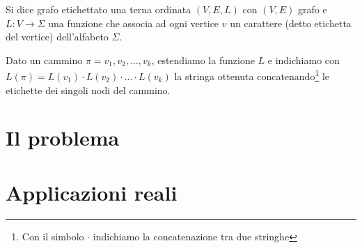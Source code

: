 \begin{definizione}\label{def:grafoetichettato}
	Si dice grafo etichettato una terna ordinata $(V,E,L)$ con $(V,E)$ grafo e $L : V \rightarrow \Sigma$ una funzione che associa ad ogni vertice $v$ un carattere (detto etichetta del vertice) dell'alfabeto $\Sigma$.   
\end{definizione}

	Dato un cammino $\pi = v_{1}, v_{2}, \ldots, v_{k}$,
	estendiamo la funzione $L$ e indichiamo con $L(\pi) = L(v_{1}) \cdot L(v_{2}) \cdot \ldots \cdot L(v_{k})$ la stringa ottenuta concatenando\footnote{Con il simbolo $\cdot$ indichiamo la concatenazione tra due stringhe} le etichette dei singoli nodi del cammino.
	

\section{Il problema}

\section{Applicazioni reali}


